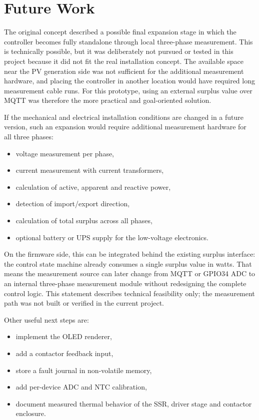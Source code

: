 \documentclass[12pt,a4paper]{article}
\begin{document}
\newpage
\section{Future Work}

The original concept described a possible final expansion stage in which the
controller becomes fully standalone through local three-phase measurement. This is
technically possible, but it was deliberately not pursued or tested in this
project because it did not fit the real installation concept. The available space
near the PV generation side was not sufficient for the additional measurement
hardware, and placing the controller in another location would have required long
measurement cable runs. For this prototype, using an external surplus value over
MQTT was therefore the more practical and goal-oriented solution.

If the mechanical and electrical installation conditions are changed in a future
version, such an expansion would require additional measurement hardware for all
three phases:

\begin{itemize}
  \item voltage measurement per phase,
  \item current measurement with current transformers,
  \item calculation of active, apparent and reactive power,
  \item detection of import/export direction,
  \item calculation of total surplus across all phases,
  \item optional battery or UPS supply for the low-voltage electronics.
\end{itemize}

On the firmware side, this can be integrated behind the existing surplus interface:
the control state machine already consumes a single surplus value in watts. That
means the measurement source can later change from MQTT or GPIO34 ADC to an
internal three-phase measurement module without redesigning the complete control
logic. This statement describes technical feasibility only; the measurement path
was not built or verified in the current project.

Other useful next steps are:

\begin{itemize}
  \item implement the OLED renderer,
  \item add a contactor feedback input,
  \item store a fault journal in non-volatile memory,
  \item add per-device ADC and NTC calibration,
  \item document measured thermal behavior of the SSR, driver stage and
  contactor enclosure.
\end{itemize}
\end{document}
